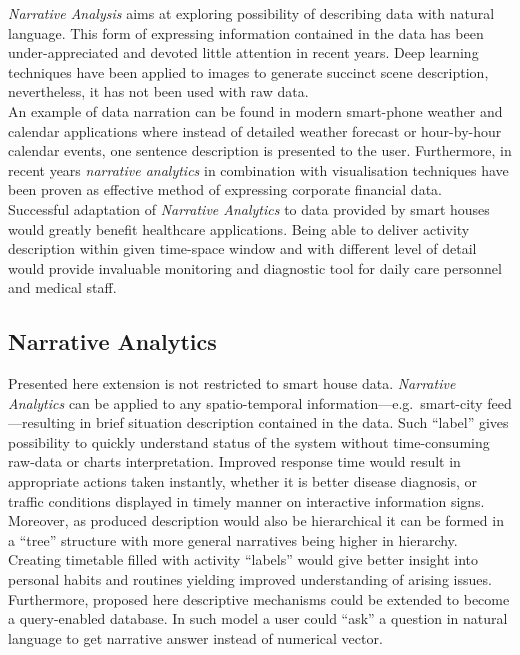 \documentclass[12pt, a4paper, pdflatex, leqno, twoside, openright]{report}
\begin{document}
\emph{Narrative Analysis} aims at exploring possibility of describing data with natural language. This form of expressing information contained in the data has been under-appreciated and devoted little attention in recent years. Deep learning techniques have been applied to images to generate succinct scene description, nevertheless, it has not been used with raw data.\\
An example of data narration can be found in modern smart-phone weather and calendar applications where instead of detailed weather forecast or hour-by-hour calendar events, one sentence description is presented to the user. Furthermore, in recent years \emph{narrative analytics} in combination with visualisation techniques have been proven as effective method of expressing corporate financial data.\\

Successful adaptation of \emph{Narrative Analytics} to data provided by smart houses would greatly benefit healthcare applications. Being able to deliver activity description within given time-space window and with different level of detail would provide invaluable monitoring and diagnostic tool for daily care personnel and medical staff.

    \subsection{Narrative Analytics}
Presented here extension is not restricted to smart house data. \emph{Narrative Analytics} can be applied to any spatio-temporal information---e.g.\ smart-city feed---resulting in brief situation description contained in the data. Such ``label'' gives possibility to quickly understand status of the system without time-consuming raw-data or charts interpretation. Improved response time would result in appropriate actions taken instantly, whether it is better disease diagnosis, or traffic conditions displayed in timely manner on interactive information signs.\\
Moreover, as produced description would also be hierarchical it can be formed in a ``tree'' structure with more general narratives being higher in hierarchy. Creating timetable filled with activity ``labels'' would give better insight into personal habits and routines yielding improved understanding of arising issues.\\
Furthermore, proposed here descriptive mechanisms could be extended to become a query-enabled database. In such model a user could ``ask'' a question in natural language to get narrative answer instead of numerical vector.\\
\end{document}
